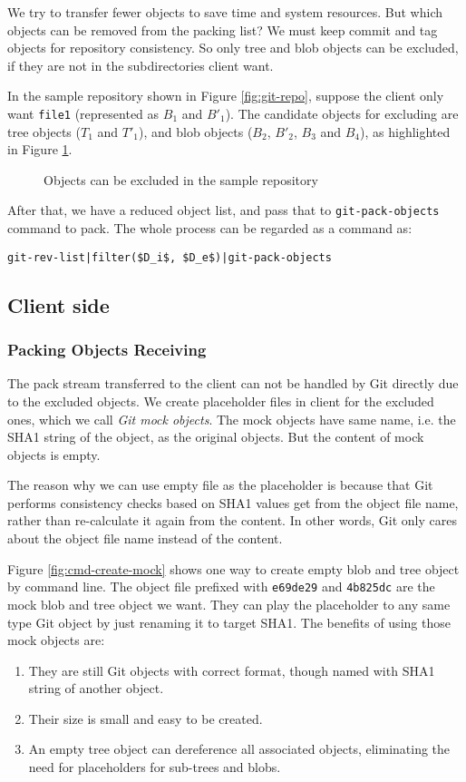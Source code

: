 \documentclass[preprint]{sigplanconf}
\begin{document}
We try to transfer fewer objects to save time and system resources.
But which objects can be removed from the packing list?
We must keep commit and tag objects for repository consistency.
So only tree and blob objects can be excluded, if they are not in the subdirectories client want.

In the sample repository shown in Figure \ref{fig:git-repo}, suppose the client only want \verb|file1| (represented as $B_1$ and $B'_1$).
The candidate objects for excluding are tree objects ($T_1$ and $T'_1$), and blob objects ($B_2$, $B'_2$, $B_3$ and $B_4$), as highlighted in Figure \ref{fig:find-obj-to-remove}.
\begin{figure}[htpb]
  \centering
  
  \caption{Objects can be excluded in the sample repository}
  \label{fig:find-obj-to-remove}
\end{figure}

After that, we have a reduced object list, and pass that to \verb|git-pack-objects| command to pack.
The whole process can be regarded as a command as:
\begin{verbatim}
git-rev-list|filter($D_i$, $D_e$)|git-pack-objects
\end{verbatim}

\subsection{Client side}
\subsubsection{Packing Objects Receiving}
The pack stream transferred to the client can not be handled by Git directly due to the excluded objects.
We create placeholder files in client for the excluded ones, which we call \emph{Git mock objects}.
The mock objects have same name, i.e. the SHA1 string of the object, as the original objects.
But the content of mock objects is empty.

The reason why we can use empty file as the placeholder is because that Git performs consistency checks based on SHA1 values get from the object file name, rather than re-calculate it again from the content. In other words, Git only cares about the object file name instead of the content.

Figure \ref{fig:cmd-create-mock} shows one way to create empty blob and tree object by command line.
The object file prefixed with \verb|e69de29| and \verb|4b825dc| are the mock blob and tree object we want.
They can play the placeholder to any same type Git object by just renaming it to target SHA1.
The benefits of using those mock objects are:
\begin{enumerate}
  \item They are still Git objects with correct format, though named with SHA1 string of another object.
  \item Their size is small and easy to be created.
  \item An empty tree object can dereference all associated objects, eliminating the need for placeholders for sub-trees and blobs.
\end{enumerate}
\end{document}
